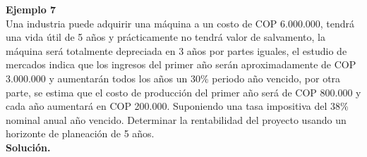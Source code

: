 \textbf{Ejemplo 7}\\
Una industria puede adquirir una máquina a un costo de  COP  6.000.000, tendrá una vida útil de 5 años y prácticamente no tendrá valor de salvamento, la máquina será totalmente depreciada en 3 años por partes iguales, el estudio de mercados indica que los ingresos del primer año serán aproximadamente de  COP  3.000.000 y aumentarán todos los años un 30\% periodo año vencido, por otra parte, se estima que el costo de producción del primer año será de  COP  800.000 y cada año aumentará en  COP  200.000. Suponiendo una tasa impositiva del 38\% nominal anual año vencido. Determinar la rentabilidad del proyecto usando un horizonte de planeación de 5 años.
\\

\textbf{Solución.}\\
